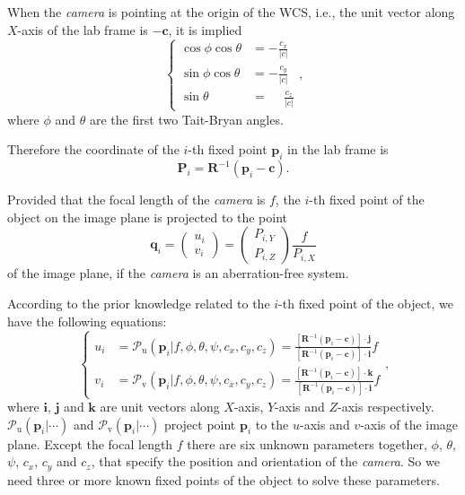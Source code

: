 \documentclass{article}
\renewcommand{\vec}[1]{\mathbf{#1}}
\newcommand{\pu}[1]{\mathscr{P}_\mathrm{u}\left(#1\right)}
\newcommand{\pv}[1]{\mathscr{P}_\mathrm{v}\left(#1\right)}
\begin{document}
When the \emph{camera} is pointing at the origin of the WCS, i.e.,
the unit vector along $X$-axis of the lab frame is $-\vec{c}$,
it is implied
\begin{equation}
  \left\{\begin{split}
    \cos\phi\cos\theta &= -\frac{c_x}{\lvert c \rvert}\\
    \sin\phi\cos\theta &= -\frac{c_y}{\lvert c \rvert}\\
            \sin\theta &= \phantom{-} \frac{c_z}{\lvert c \rvert}
  \end{split}\right.\text{,}
\end{equation}
where $\phi$ and $\theta$ are the first two Tait-Bryan angles.

Therefore the coordinate of the $i$-th fixed point $\vec{p}_i$ in the lab frame is
\begin{equation}
  \vec{P}_i = \vec{R}^{-1}\left(\vec{p}_i - \vec{c}\right)\text{.}
\end{equation}

Provided that the focal length of the \emph{camera} is $f$,
the $i$-th fixed point of the object on the image plane is projected to the point
\begin{equation}
  \vec{q}_i =
  \begin{pmatrix}
    u_i \\
    v_i
  \end{pmatrix} =
  \begin{pmatrix}
    P_{i,Y} \\
    P_{i,Z}
  \end{pmatrix}\frac{f}{P_{i,X}}
\end{equation}
of the image plane, if the \emph{camera} is an aberration-free system.

According to the prior knowledge related to the $i$-th fixed point of the object,
we have the following equations:
\begin{equation}
  \left\{\begin{split}
  u_i &= \pu{\vec{p}_i | f, \phi, \theta, \psi, c_x, c_y, c_z} = \frac{\left[\vec{R}^{-1}\left(\vec{p}_i-\vec{c}\right)\right] \cdot \vec{j}}{\left[\vec{R}^{-1}\left(\vec{p}_i-\vec{c}\right)\right] \cdot \vec{i}} f \\
  v_i &= \pv{\vec{p}_i | f, \phi, \theta, \psi, c_x, c_y, c_z} = \frac{\left[\vec{R}^{-1}\left(\vec{p}_i-\vec{c}\right)\right] \cdot \vec{k}}{\left[\vec{R}^{-1}\left(\vec{p}_i-\vec{c}\right)\right] \cdot \vec{i}} f
  \end{split}\right.\text{,}
  \label{equ:perspective-projection}
\end{equation}
where $\vec{i}$, $\vec{j}$ and $\vec{k}$ are unit vectors along $X$-axis, $Y$-axis and $Z$-axis respectively.
$\pu{\vec{p}_i | \cdots}$ and $\pv{\vec{p}_i | \cdots}$ project point $\vec{p}_i$ to the $u$-axis and $v$-axis of the image plane.
Except the focal length $f$ there are six unknown parameters together, $\phi$, $\theta$, $\psi$, $c_x$, $c_y$ and $c_z$,
that specify the position and orientation of the \emph{camera}.
So we need three or more known fixed points of the object to solve these parameters.
\end{document}
